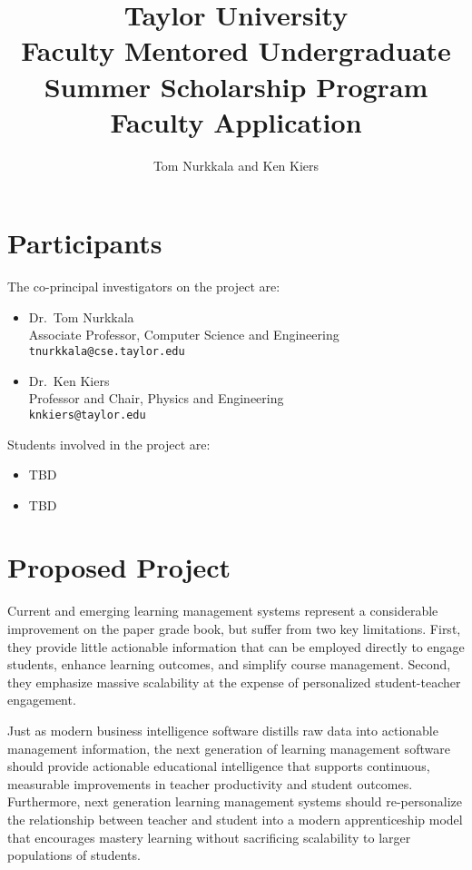 \documentclass{article}
\title{Taylor University\\
  Faculty Mentored Undergraduate\\
  Summer Scholarship Program\\
  Faculty Application}
\author{Tom Nurkkala and Ken Kiers}
\begin{document}
\maketitle
\tableofcontents
\newpage

\section{Participants}
\label{sec:participants}

The co-principal investigators on the project are:
\begin{itemize}
\item Dr.\ Tom Nurkkala\\
  Associate Professor, Computer Science and Engineering\\
  \texttt{tnurkkala@cse.taylor.edu}
\item Dr.\ Ken Kiers\\
  Professor and Chair, Physics and Engineering\\
  \texttt{knkiers@taylor.edu}
\end{itemize}

Students involved in the project are:
  \begin{itemize}
  \item TBD
  \item TBD
  \end{itemize}


\section{Proposed Project}
\label{sec:proposed-project}


Current and emerging learning management systems
represent a considerable improvement on the paper grade book,
but suffer from two key limitations.
First, they provide little actionable information
that can be employed directly
to engage students,
enhance learning outcomes,
and simplify course management.
Second, they emphasize massive scalability
at the expense of
personalized student-teacher engagement.

Just as modern business intelligence software
distills raw data into action\-able management information,
the next generation of learning management software
should provide actionable educational intelligence
that supports continuous, measurable improvements
in teacher productivity and student outcomes.
Furthermore, next generation learning management systems
should re-personalize the relationship between teacher and student
into a modern apprenticeship model that
encourages mastery learning without sacrificing scalability
to larger populations of students.
\end{document}
